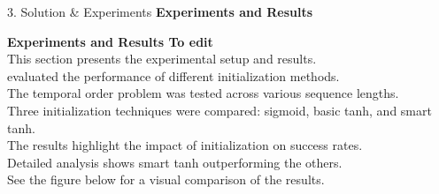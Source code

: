 \begin{frame}[t]
\begin{columns}[t,totalwidth=\textwidth]
\begin{column}{0.33\textwidth}
\begin{block}{3. Solution \& Experiments}
  \textbf{Experiments and Results}
  \vspace{0.5cm}

  \textbf{Experiments and Results To edit} \\
  This section presents the experimental setup and results. \\
  evaluated the performance of different initialization methods. \\
  The temporal order problem was tested across various sequence lengths. \\
  Three initialization techniques were compared: sigmoid, basic tanh, and smart tanh. \\
  The results highlight the impact of initialization on success rates. \\
  Detailed analysis shows smart tanh outperforming the others. \\
  See the figure below for a visual comparison of the results.


\end{block}
\end{column}
\end{columns}
\end{frame}
